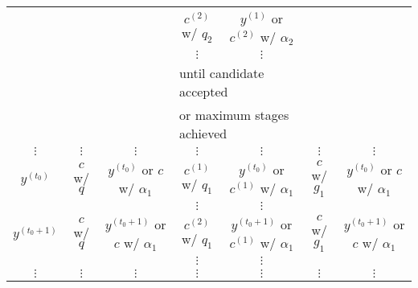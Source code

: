 \begin{sidewaystable}[h]
\begin{tabular}{|c||c|c||c|c||c|c|}
\cline{4-5}
                     &                         &                                         & $c^{(2)}$ w/ $q_2$     & $y^{(1)}$ or $c^{(2)}$ w/ $\alpha_2$       &                  &                                         \\
\cline{4-5}
                     &                         &                                         & $\vdots$               & $\vdots$                                        &                  &                                         \\
\cline{4-5}
                     &                         &                                         & \multicolumn{2}{l||}{until candidate accepted}                           &                  &                                         \\
                     &                         &                                         & \multicolumn{2}{l||}{or maximum stages achieved}                         &                  &                                         \\
\hline
\hline
$\vdots$             & $\vdots$                & $\vdots$                                & $\vdots$               & $\vdots$                                        & $\vdots$         & $\vdots$                                \\
\hline
\hline
$y^{(t_0)}$     & $c$ w/ $q$              & $y^{(t_0)}$ or $c$ w/ $\alpha_1$     & $c^{(1)}$ w/ $q_1$     & $y^{(t_0)}$ or $c^{(1)}$ w/ $\alpha_1$     & $c$ w/ $g_1$     & $y^{(t_0)}$ or $c$ w/ $\alpha_1$     \\
\cline{4-5}
                     &                         &                                         & $\vdots$               & $\vdots$                                        &                  &                                         \\
\hline
\hline
$y^{(t_0+1)}$   & $c$ w/ $q$              & $y^{(t_0+1)}$ or $c$ w/ $\alpha_1$   & $c^{(2)}$ w/ $q_1$     & $y^{(t_0+1)}$ or $c^{(1)}$ w/ $\alpha_1$   & $c$ w/ $g_1$     & $y^{(t_0+1)}$ or $c$ w/ $\alpha_1$   \\
\cline{4-5}
                     &                         &                                         & $\vdots$               & $\vdots$                                        &                  &                                         \\
\hline
\hline
$\vdots$             & $\vdots$                & $\vdots$                                & $\vdots$               & $\vdots$                                        & $\vdots$         & $\vdots$                                \\

\end{tabular}
\end{sidewaystable}
